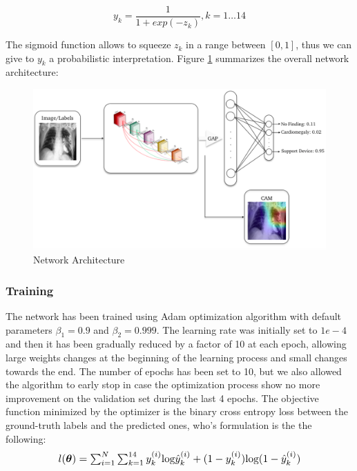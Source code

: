 \begin{equation}
    y_{k} = \frac{1}{1+ exp(-z_{k})} , k = 1 \dots 14
    \label{eq:eq_4.2}
\end{equation}
\vspace{3mm}

\noindent The sigmoid function allows to squeeze $z_{k}$ in a range between $[0,1]$, thus we can give to $y_{k}$ a probabilistic interpretation.
\noindent Figure \ref{fig:figure_4.2} summarizes the overall network architecture:


\begin{figure}[htbp!]
\centering

\includegraphics[scale=0.37]{Tesi/images/Architecture}
\caption{Network Architecture}
\label{fig:figure_4.2}
\end{figure}



\vspace{5mm}

\subsubsection{Training}

\noindent The network has been trained using Adam optimization algorithm \cite{adam} with default parameters $\beta_{1} = 0.9$ and  $\beta_{2} = 0.999$. The learning rate was initially set to $1e-4$ and then it has been gradually reduced by a factor of 10 at each epoch, allowing large weights changes at the beginning of the learning process and small changes towards the end. The number of epochs has been set to 10, but we also allowed the algorithm to early stop in case the optimization process show no more improvement on the validation set during the last 4 epochs. The objective function minimized by the optimizer is the binary cross entropy loss between the ground-truth labels and the predicted ones, who's formulation is the the following: 
\vspace{3mm}
\begin{equation}
\scalebox{1.1}{
    $l(\boldsymbol{\theta}) = \sum_{i=1}^{N} \sum_{k=1 }^{14} y_{k}^{(i)} \textup{log}  \hat{y}_{k}^{(i)} + (1-y_{k}^{(i)}) \textup{log} (1-\hat{y}_{k}^{(i)} )$
    }
    \label{eq:eq_4.3}
\end{equation}

